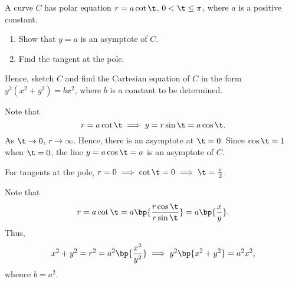 \begin{problem}
    A curve $C$ has polar equation $r = a \cot \t$, $0 < \t \leq \pi$, where $a$ is a positive constant.

    \begin{enumerate}
        \item Show that $y = a$ is an asymptote of $C$.
        \item Find the tangent at the pole.
    \end{enumerate}

     Hence, sketch $C$ and find the Cartesian equation of $C$ in the form $y^2(x^2 + y^2)= bx^2$, where $b$ is a constant to be determined.
\end{problem}
\begin{solution}
    \begin{ppart}
        Note that \[r = a\cot\t \implies y = r\sin\t = a\cos\t.\] As $\t \to 0$, $r \to \infty$. Hence, there is an asymptote at $\t = 0$. Since $\cos\t = 1$ when $\t = 0$, the line $y = a\cos\t = a$ is an asymptote of $C$.
    \end{ppart}
    \begin{ppart}
        For tangents at the pole, $r = 0 \implies \cot \t = 0 \implies \t = \frac\pi2$.

        \begin{center}
        \end{center}
        Note that \[r = a\cot\t = a\bp{\frac{r\cos\t}{r\sin\t}} = a\bp{\frac{x}{y}}.\] Thus, \[x^2 + y^2 = r^2 = a^2 \bp{\frac{x^2}{y^2}} \implies y^2\bp{x^2 + y^2} = a^2 x^2,\] whence $b = a^2$.
    \end{ppart}
\end{solution}

